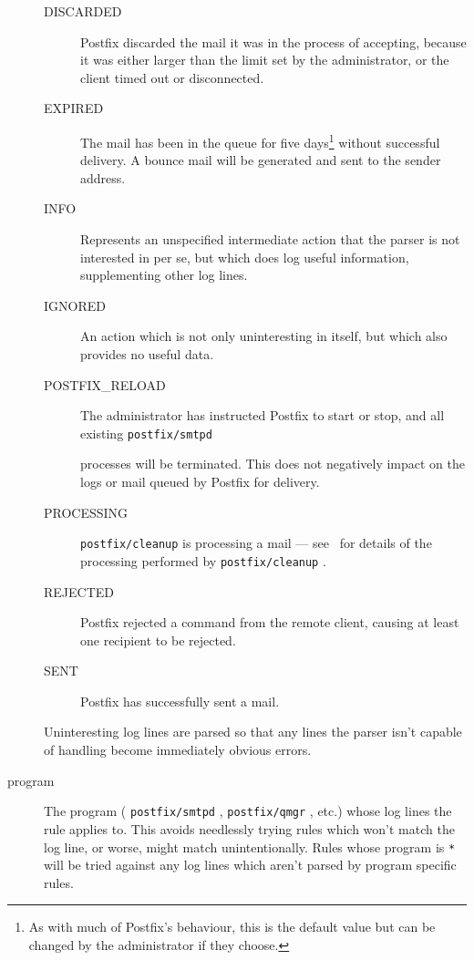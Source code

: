 \documentclass[a4paper,12pt,draft]{article}
\newcommand{\daemon}[1]{%
    \texttt{postfix/#1}%
}
\begin{document}
\begin{description}
\begin{description}
            \item [DISCARDED] Postfix discarded the mail it was in the
                process of accepting, because it was either larger than the
                limit set by the administrator, or the client timed out or
                disconnected.

            \item [EXPIRED] The mail has been in the queue for five
                days\footnote{As with much of Postfix's behaviour, this is
                the default value but can be changed by the administrator
                if they choose.} without successful delivery.  A bounce
                mail will be generated and sent to the sender address.

            \item [INFO] Represents an unspecified intermediate action that
                the parser is not interested in per se, but which does log
                useful information, supplementing other log lines.

            \item [IGNORED] An action which is not only uninteresting in
                itself, but which also provides no useful data.

            \item [POSTFIX\_RELOAD] The administrator has instructed
                Postfix to start or stop, and all existing \daemon{smtpd}
                processes will be terminated.  This does not negatively
                impact on the logs or mail queued by Postfix for delivery.

            \item [PROCESSING] \daemon{cleanup} is processing a mail ---
                see~\cite{postfix-cleanup} for details of the processing
                performed by \daemon{cleanup}.

            \item [REJECTED] Postfix rejected a command from the remote
                client, causing at least one recipient to be rejected.

            \item [SENT] Postfix has successfully sent a mail.

        \end{description}

        Uninteresting log lines are parsed so that any lines the parser
        isn't capable of handling become immediately obvious errors.

    \item [program] The program (\daemon{smtpd}, \daemon{qmgr}, etc.) whose
        log lines the rule applies to.  This avoids needlessly trying rules
        which won't match the log line, or worse, might match
        unintentionally.  Rules whose program is \texttt{*} will be tried
        against any log lines which aren't parsed by program specific
        rules.


\end{description}
\end{document}
